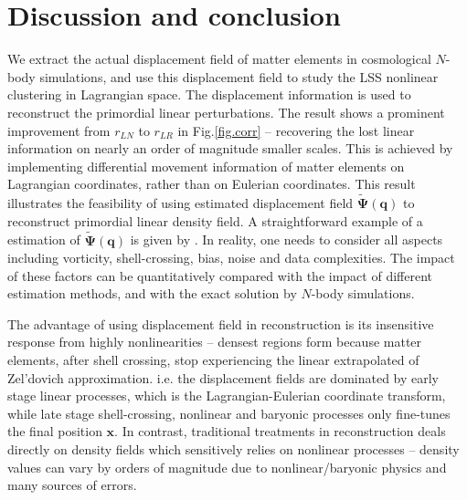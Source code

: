 \documentclass[aps,prd,twocolumn,superscriptaddress,amsfont,amssymb,amsmath,nofootinbib,showpacs,balancelastpage]{revtex4-1}
\newcommand{\bs}{\boldsymbol}
\newcommand{\tcr}{\textcolor{red}}
\begin{document}
\section{Discussion and conclusion}\label{sec.discussion}
We extract the actual displacement field of matter elements in cosmological $N$-body
simulations, and use this displacement field to study the LSS nonlinear
clustering in Lagrangian space. The displacement information is used to reconstruct
the primordial linear perturbations. The result shows a prominent improvement from
$r_{LN}$ to $r_{LR}$ in Fig.\ref{fig.corr} -- recovering the lost linear information on
nearly an order of magnitude smaller scales.
This is achieved by implementing differential movement information
of matter elements on Lagrangian coordinates, rather than on
Eulerian coordinates. This result illustrates the feasibility
of using estimated displacement field $\tilde{\bs \Psi}(\bs q)$ to reconstruct primordial linear
density field. A straightforward example of a estimation of $\tilde{\bs \Psi}(\bs q)$
is given by \cite{1995ApJS..100..269P,1998ApJS..115...19P}.
In reality, one needs
to consider all aspects including vorticity, shell-crossing, bias, noise
and data complexities. The impact of these factors can be quantitatively
compared with the impact of different estimation methods, and with
the exact solution by $N$-body simulations.


The advantage of using displacement field in reconstruction is
its insensitive response from highly nonlinearities --
densest regions form because matter elements, after shell crossing,
stop experiencing the linear extrapolated of Zel'dovich approximation.
i.e. the displacement fields are dominated by early stage linear processes,
which is the Lagrangian-Eulerian coordinate transform,
while late stage shell-crossing, nonlinear and baryonic processes
only fine-tunes the final position $\bs x$. In contrast, traditional
treatments in reconstruction deals directly on density fields which sensitively
relies on nonlinear processes --  density values can vary by orders
of magnitude due to nonlinear/baryonic physics and many sources of errors.
\end{document}
